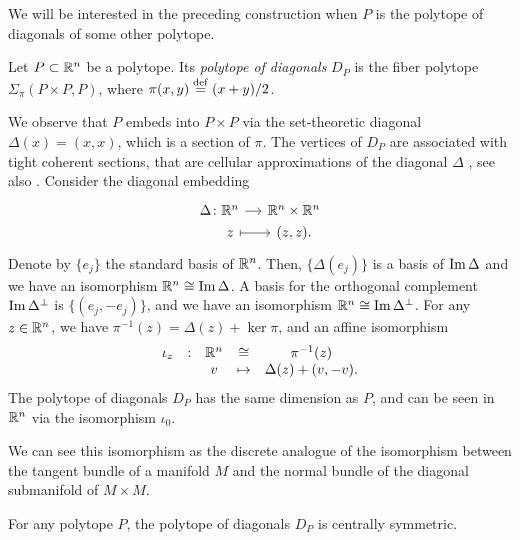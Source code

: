 
We will be interested in the preceding construction when $P$ is the polytope of diagonals of some other polytope.

\begin{definition}
	Let $P\subset \mathbb{R}^n$ be a polytope.
	Its \emph{polytope of diagonals} $D_P$ is the fiber polytope $\Sigma_\pi(P\times P, P)$, where $\pi(x,y)\stackrel{\mathrm{def}}{=} (x+y)/2$.
\end{definition}

We observe that $P$ embeds into $P\times P$ via the set-theoretic diagonal $\Delta (x)=(x,x)$, which is a section of $\pi$.
The vertices of $D_P$ are associated with tight coherent sections, that are cellular approximations of the diagonal $\Delta$ \cite[Proposition 5]{MTTV19}, see also \cite[Proposition 1.1]{GLA21}.
Consider the diagonal embedding
\[
\begin{tikzcd}[row sep=0, column sep=small]
	\Delta \colon \R^n \arrow{r} & \R^n \times \R^n \\
	\phantom{\Delta \colon} z \arrow[r, |->] & (z,z).
\end{tikzcd}
\]
Denote by $\{e_j\}$ the standard basis of $\mathbb{R}^n$.
Then, $\{\Delta (e_j)\}$ is a basis of $\operatorname{\mathrm{Im}} \Delta$ and we have an isomorphism $\mathbb{R}^n \cong \operatorname{\mathrm{Im}} \Delta$.
A basis for the orthogonal complement $\operatorname{\mathrm{Im}} \Delta^{\bot}$ is $\{(e_j,-e_j)\}$, and we have an isomorphism $\mathbb{R}^n \cong \operatorname{\mathrm{Im}} \Delta^{\bot}$.
For any $z \in \mathbb{R}^n$, we have $\pi^{-1}(z)=\Delta(z)+\ker \pi$, and an affine isomorphism
\begin{equation} \label{eq:D_P-iso}
	\begin{matrix}
		\iota_z & : & \mathbb{R}^n  & \cong & \pi^{-1}(z) \\
		& & v  & \mapsto & \Delta(z)+(v,-v).
	\end{matrix}
\end{equation}
The polytope of diagonals $D_P$ has the same dimension as $P$, and can be seen in $\mathbb{R}^n$ via the isomorphism $\iota_0$.

\begin{remark}
	We can see this isomorphism as the discrete analogue of the isomorphism between the tangent bundle of a manifold $M$ and the normal bundle of the diagonal submanifold of $M\times M$.
\end{remark}

\begin{proposition}
	For any polytope $P$, the polytope of diagonals $D_P$ is centrally symmetric.
\end{proposition}

